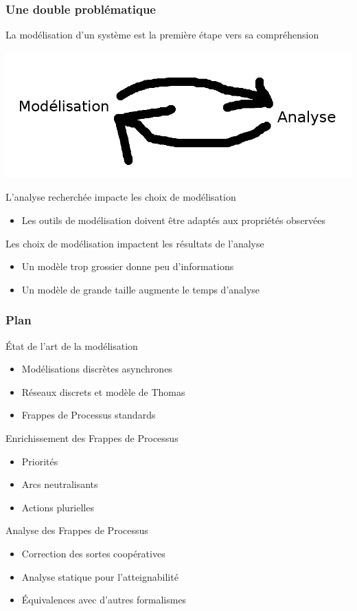 
\begin{frame}[c]
  \frametitle{Une double problématique}

La modélisation d'un système est la première étape vers sa compréhension

\begin{center}
  \includegraphics[width=.4\textwidth]{figs/modelanalyse.png}
\end{center}

L'analyse recherchée impacte les choix de modélisation
\begin{itemize}
  \item Les outils de modélisation doivent être adaptés aux propriétés observées
\end{itemize}

\medskip
Les choix de modélisation impactent les résultats de l'analyse
\begin{itemize}
  \item Un modèle trop grossier donne peu d'informations
  \item Un modèle de grande taille augmente le temps d'analyse
\end{itemize}

\medskip
\begin{center}
\end{center}

\end{frame}



\begin{frame}[c]
\frametitle{Plan}


État de l'art de la modélisation
\begin{itemize}
  \item Modélisations discrètes asynchrones
  \item Réseaux discrets et modèle de Thomas
  \item Frappes de Processus standards
\end{itemize}

Enrichissement des Frappes de Processus
\begin{itemize}
  \item Priorités
  \item Arcs neutralisants
  \item Actions plurielles
\end{itemize}

Analyse des Frappes de Processus
\begin{itemize}
  \item Correction des sortes coopératives
  \item Analyse statique pour l'atteignabilité
  \item Équivalences avec d'autres formalismes
\end{itemize}

\end{frame}
